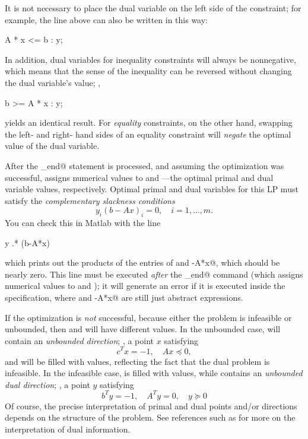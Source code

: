 \documentclass[12pt]{article}
\begin{document}
It is not necessary to place the dual variable on the left side of the
constraint; for example, the line above can also be written in this way:
\begin{code}
	A * x <= b : y;
\end{code}
In addition, dual variables for inequality constraints
will always be nonnegative, which means that the sense of the inequality 
can be reversed without changing the dual variable's value; \ie,
\begin{code}
	b >= A * x : y;
\end{code}
yields an identical result. For \emph{equality} constraints, on the other
hand, swapping the left- and right- hand sides of an equality constraint
will \emph{negate} the optimal value of the dual variable.

After the \verb@cvx_end@ statement is processed, and assuming the
optimization was successful, \cvx assigns numerical values to
\verb@x@ and \verb@y@---the optimal primal and dual variable values,
respectively. Optimal primal and dual variables for this LP must
satisfy the \emph{complementary slackness conditions}
\begin{equation}
	y_i ( b - A x )_i = 0, \quad i=1,\dots,m.
\end{equation}
You can check this in Matlab with the line
\begin{code}
	y .* (b-A*x)
\end{code}
which prints out the products of the entries of \verb@y@ and 
\verb@b-A*x@, which should be nearly zero.
This line must be executed \emph{after} the \verb@cvx_end@ command
(which assigns numerical values to \verb@x@ and \verb@y@); it will
generate an error if it is executed inside the \cvx specification,
where \verb@y@ and \verb@b-A*x@ are still just abstract expressions.

If the optimization is \emph{not} successful, because either the problem
is infeasible or unbounded, then \verb@x@ and \verb@y@ will have different
values. In the unbounded case, \verb@x@ will contain an \emph{unbounded direction};
\ie, a point $x$ satisfying
\begin{equation}
	c^T x = -1, \quad A x \preceq 0,
\end{equation}
and \verb@y@ will be filled with \verb@NaN@ values, reflecting the fact
that the dual problem is infeasible. In the infeasible case,
\verb@x@ is filled with \verb@NaN@ values, while \verb@y@
contains an \emph{unbounded dual direction}; \ie, a point $y$ satisfying
\begin{equation}
	b^T y = -1, \quad A^T y = 0, \quad y \succeq 0
\end{equation}
Of course, the precise interpretation of primal and dual points and/or
directions depends on the structure of the problem. See references
such as \cite{BV:04} for more on the interpretation of dual information.
\end{document}

